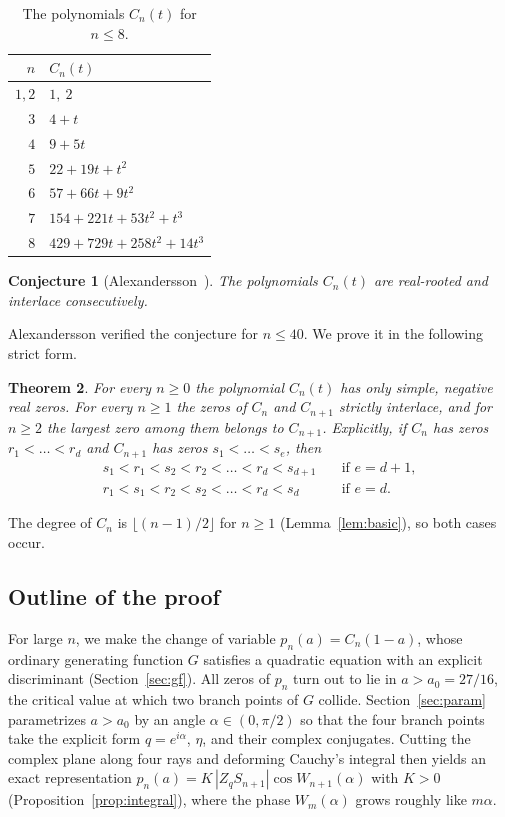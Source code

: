 \documentclass[11pt]{amsart}
\newtheorem{theorem}{Theorem}[section]
\newtheorem{conjecture}[theorem]{Conjecture}
\theoremstyle{remark}
\begin{document}
\begin{table}[ht]
\centering
\begin{tabular}{@{}rl@{}}
\toprule
$n$ & $C_n(t)$\\
\midrule
$1,2$ & $1,\ 2$\\
$3$ & $4+t$\\
$4$ & $9+5t$\\
$5$ & $22+19t+t^2$\\
$6$ & $57+66t+9t^2$\\
$7$ & $154+221t+53t^2+t^3$\\
$8$ & $429+729t+258t^2+14t^3$\\
\bottomrule
\end{tabular}
\caption{The polynomials $C_n(t)$ for $n\le 8$.}\label{tab:rows}
\end{table}

\begin{conjecture}[Alexandersson~\cite{Ale}]\label{conj:alex}
The polynomials $C_n(t)$ are real-rooted and interlace consecutively.
\end{conjecture}

Alexandersson verified the conjecture for $n\le 40$. We prove it in the
following strict form.

\begin{theorem}\label{thm:main}
For every $n\ge0$ the polynomial $C_n(t)$ has only simple, negative real zeros.
For every $n\ge1$ the zeros of $C_n$ and $C_{n+1}$ strictly interlace, and for
$n\ge2$ the largest zero among them belongs to $C_{n+1}$. Explicitly, if $C_n$ has zeros
$r_1<\dots<r_d$ and $C_{n+1}$ has zeros $s_1<\dots<s_e$, then
\begin{align*}
 s_1<r_1<s_2<r_2<\dots<r_d<s_{d+1}&\quad\text{if } e=d+1,\\
 r_1<s_1<r_2<s_2<\dots<r_d<s_d&\quad\text{if } e=d.
\end{align*}
\end{theorem}

The degree of $C_n$ is $\lfloor(n-1)/2\rfloor$ for $n\ge1$
(Lemma~\ref{lem:basic}), so both cases occur.

\subsection*{Outline of the proof}
For large $n$, we make the change of variable $p_n(a)=C_n(1-a)$, whose
ordinary generating function $G$ satisfies a quadratic equation with an
explicit discriminant (Section~\ref{sec:gf}). All zeros of $p_n$ turn out to
lie in $a>a_0=27/16$, the critical value at which two branch points of $G$
collide. Section~\ref{sec:param} parametrizes $a>a_0$ by an angle
$\alpha\in(0,\pi/2)$ so that the four branch points take the explicit form
$q=e^{i\alpha}$, $\eta$, and their complex conjugates. Cutting the complex
plane along four rays and deforming Cauchy's integral then yields an exact
representation $p_n(a)=K\,|Z_q S_{n+1}|\cos W_{n+1}(\alpha)$ with $K>0$
(Proposition~\ref{prop:integral}), where the phase $W_m(\alpha)$ grows
roughly like $m\alpha$.
\end{document}
